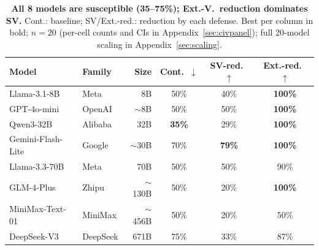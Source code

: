 \documentclass{article}
\theoremstyle{plain}
\theoremstyle{definition}
\begin{document}
\begin{table}[!htbp]
\centering
\scriptsize
\setlength{\tabcolsep}{3pt}
\begin{tabular}{@{}llrccc@{}}
\toprule
\textbf{Model} & \textbf{Family} & \textbf{Size} & \textbf{Cont.\ $\downarrow$} & \textbf{SV-red.\ $\uparrow$} & \textbf{Ext.-red.\ $\uparrow$} \\
\midrule
Llama-3.1-8B & Meta & 8B & 50\% & 40\% & \textbf{100\%} \\
GPT-4o-mini & OpenAI & $\sim$8B & 50\% & 50\% & \textbf{100\%} \\
Qwen3-32B & Alibaba & 32B & \textbf{35\%} & 29\% & \textbf{100\%} \\
Gemini-Flash-Lite & Google & $\sim$30B & 70\% & \textbf{79\%} & \textbf{100\%} \\
Llama-3.3-70B & Meta & 70B & 50\% & 50\% & 90\% \\
GLM-4-Plus & Zhipu & $\sim$130B & 50\% & 20\% & \textbf{100\%} \\
MiniMax-Text-01 & MiniMax & $\sim$456B & 50\% & 20\% & 50\% \\
DeepSeek-V3 & DeepSeek & 671B & 75\% & 33\% & 87\% \\
\bottomrule
\end{tabular}
\caption{\textbf{All 8 models are susceptible (35--75\%); Ext.-V.\ reduction dominates SV.} Cont.: baseline; SV/Ext.-red.: reduction by each defense. Best per column in bold; $n=20$ (per-cell counts and CIs in Appendix~\ref{sec:civpanel}); full 20-model scaling in Appendix~\ref{sec:scaling}.}
\label{tab:unified}
\end{table}
\end{document}
